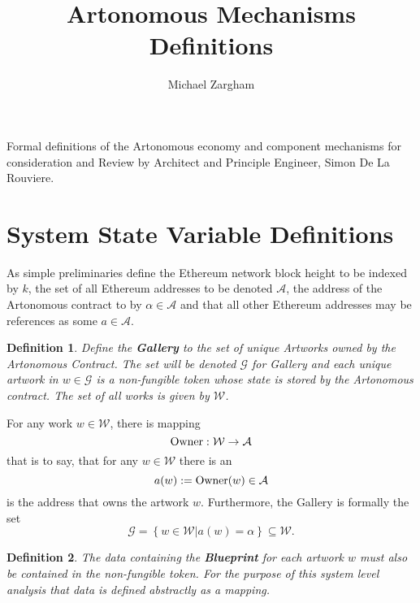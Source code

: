 \documentclass[11pt]{amsart}
\title{Artonomous Mechanisms Definitions}
\author{Michael Zargham}
\newtheorem{definition}{Definition}
\begin{document}
\maketitle
Formal definitions of the Artonomous economy and component mechanisms for consideration and Review by Architect and Principle Engineer, Simon De La Rouviere. %

\section{System State Variable Definitions}

As simple preliminaries define the Ethereum network block height to be indexed by $k$, the set of all Ethereum addresses to be denoted $\mathcal{A}$, the address of the Artonomous contract to by $\alpha\in \mathcal{A}$ and that all other Ethereum addresses may be references as some $a\in \mathcal{A}$.

\begin{definition}
Define the \textbf{Gallery} to the set of unique Artworks owned by the Artonomous Contract. The set will be denoted $\mathcal{G}$ for Gallery and each unique artwork in $w\in \mathcal{G}$ is a non-fungible token whose state is stored by the Artonomous contract.  The set of all works is given by $\mathcal{W}$.
\end{definition}

For any work $w\in \mathcal{W}$, there is mapping 
\begin{equation}
\hbox{Owner}: \mathcal{W} \rightarrow \mathcal{A}
\end{equation}
that is to say, that for any $w\in \mathcal{W}$ there is an
\begin{equation}
a(w) := \hbox{Owner}(w) \in  \mathcal{A}
\end{equation}
is the address that owns the artwork $w$.  Furthermore, the Gallery is formally the set
\begin{equation}
\mathcal{G} = \left\{w\in \mathcal{W} |  a(w)  = \alpha \right\} \subseteq \mathcal{W}.
\end{equation}

\begin{definition} The data containing the \textbf{Blueprint} for each artwork $w$ must also be contained in the non-fungible token. For the purpose of this system level analysis that data is defined abstractly as a mapping.
\end{definition}
\end{document}
